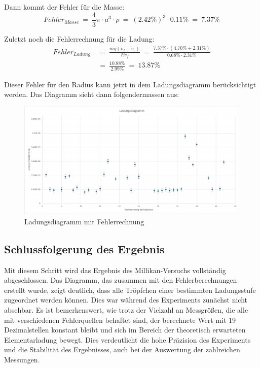 \noindent Dann kommt der Fehler für die Masse:
\begin{equation*}\label{eq:fehlerMasse}
	Fehler_{Masse} \ = \ \frac{4}{3} \pi \cdot a^3 \cdot \rho \ = \ (2.42\%)^3 \cdot 0.11\% \ = \ 7.37\%
\end{equation*}

\noindent Zuletzt noch die Fehlerrechnung für die Ladung:
\begin{equation*}
	\begin{split}
		Fehler_{Ladung} & \ = \ \frac{mg(v_f + v_r)}{Ev_f} \ = \ \frac{7.37\% \cdot (4.70\% + 2.31\%)}{0.68\% \cdot 2.31\%} \\
		& \ = \ \frac{10.88\%}{2.99\%} \ = \ 13.87\%	
	\end{split}
\end{equation*}

\noindent Dieser Fehler für den Radius kann jetzt in dem Ladungsdiagramm berücksichtigt werden. Das Diagramm sieht dann folgendermassen aus:

\begin{figure}[h]
	\centering
	\includegraphics[width=\textwidth]{bilder/pdf/LadungsdiagrammMit.pdf}
	\caption{Ladungsdiagramm mit Fehlerrechnung}
	\label{fig:ladungsdiagrammMFehlerrechnung}
\end{figure}

\subsection{Schlussfolgerung des Ergebnis}\label{sub:schlussfolgerung}
Mit diesem Schritt wird das Ergebnis des Millikan-Versuchs vollständig abgeschlossen. Das Diagramm, das zusammen mit den Fehlerberechnungen erstellt wurde, zeigt deutlich, dass alle Tröpfchen einer bestimmten Ladungsstufe zugeordnet werden können. Dies war während des Experiments zunächst nicht absehbar. Es ist bemerkenswert, wie trotz der Vielzahl an Messgrößen, die alle mit verschiedenen Fehlerquellen behaftet sind, der berechnete Wert mit 19 Dezimalstellen konstant bleibt und sich im Bereich der theoretisch erwarteten Elementarladung bewegt. Dies verdeutlicht die hohe Präzision des Experiments und die Stabilität des Ergebnisses, auch bei der Auswertung der zahlreichen Messungen.



